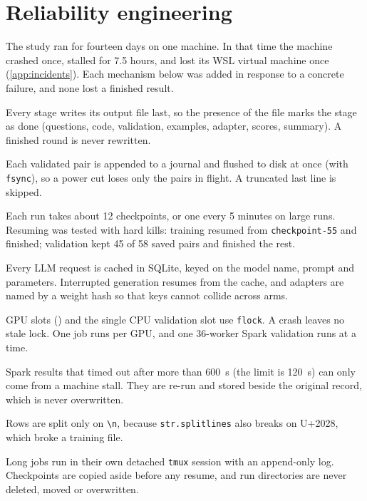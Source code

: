 \section{Reliability engineering}\label{sec:reliability}

The study ran for fourteen days on one machine. In that time the machine crashed once, stalled for 7.5 hours, and lost
its WSL virtual machine once (\cref{app:incidents}). Each mechanism below was added in response to a concrete failure,
and none lost a finished result.

\begin{description}[style=nextline,leftmargin=1.2em]
\item[Resume from files.] Every stage writes its output file last, so the presence of the file marks the stage as
done (questions, code, validation, examples, adapter, scores, summary). A finished round is never rewritten.
\item[Journalled validation.] Each validated pair is appended to a journal and flushed to disk at once (with
\texttt{fsync}), so a power cut loses only the pairs in flight. A truncated last line is skipped.
\item[Frequent checkpoints.] Each run takes about 12 checkpoints, or one every 5 minutes on large runs. Resuming was
tested with hard kills: training resumed from \texttt{checkpoint-55} and finished; validation kept 45 of 58 saved
pairs and finished the rest.
\item[Response cache.] Every LLM request is cached in SQLite, keyed on the model name, prompt and parameters.
Interrupted generation resumes from the cache, and adapters are named by a weight hash so that keys cannot collide
across arms.
\item[File locks.] GPU slots () and the single CPU validation slot use \texttt{flock}. A
crash leaves no stale lock. One job runs per GPU, and one 36-worker Spark validation runs at a time.
\item[Stall-aware execution cache.] Spark results that timed out after more than 600~s (the limit is 120~s) can only
come from a machine stall. They are re-run and stored beside the original record, which is never overwritten.
\item[Robust JSONL.] Rows are split only on \texttt{\textbackslash n}, because \texttt{str.splitlines} also breaks on
U+2028, which broke a training file.
\item[Operating rules.] Long jobs run in their own detached \texttt{tmux} session with an append-only log. Checkpoints
are copied aside before any resume, and run directories are never deleted, moved or overwritten.
\end{description}

